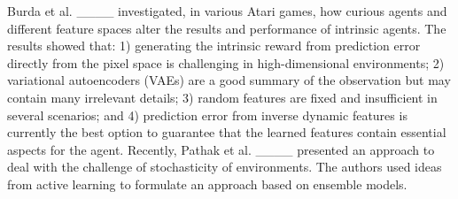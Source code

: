 

Burda et al. ____ investigated, in various Atari games, how curious agents and different feature spaces alter the results and performance of intrinsic agents. The results showed that: 1) generating the intrinsic reward from prediction error directly from the pixel space is challenging in high-dimensional environments; 2) variational autoencoders (VAEs) are a good summary of the observation but may contain many irrelevant details; 3) random features are fixed and insufficient in several scenarios; and 4) prediction error from inverse dynamic features is currently the best option to guarantee that the learned features contain essential aspects for the agent. Recently, Pathak et al. ____ presented an approach to deal with the challenge of stochasticity of environments. The authors used ideas from active learning to formulate an approach based on ensemble models.


